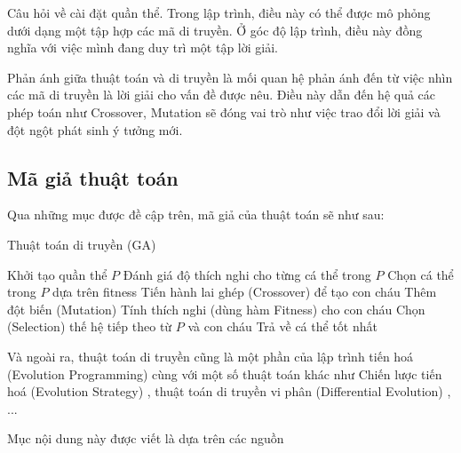 Câu hỏi về cài đặt quần thể. Trong lập trình, điều này có thể được mô phỏng dưới dạng một tập hợp các mã di truyền. Ở góc độ lập trình, điều này đồng nghĩa với việc mình đang duy trì một tập lời giải.

Phản ánh giữa thuật toán và di truyền là mối quan hệ phản ánh đến từ việc nhìn các mã di truyền là lời giải cho vấn đề được nêu. Điều này dẫn đến hệ quả các phép toán như Crossover, Mutation sẽ đóng vai trò như việc trao đổi lời giải và đột ngột phát sinh ý tưởng mới.

\subsection{Mã giả thuật toán}
Qua những mục được đề cập trên, mã giả của thuật toán sẽ như sau:
\begin{algorithm}
	\caption{Thuật toán di truyền (GA)}
	\begin{algorithmic}[1]
		\State Khởi tạo quần thể $P$
		\State Đánh giá độ thích nghi cho từng cá thể trong $P$
		\State Chọn cá thể trong $P$ dựa trên fitness
		\State Tiến hành lai ghép (Crossover) để tạo con cháu
		\State Thêm đột biến (Mutation)
		\State Tính thích nghi (dùng hàm Fitness) cho con cháu
		\State Chọn (Selection) thế hệ tiếp theo từ $P$ và con cháu
		\EndWhile
		\State Trả về cá thể tốt nhất
	\end{algorithmic}
\end{algorithm}

\noindent
Và ngoài ra, thuật toán di truyền cũng là một phần của lập trình tiến hoá (Evolution Programming) \cite{evolutionProgramming} cùng với một số thuật toán khác như Chiến lược tiến hoá (Evolution Strategy) \cite{EvolutionStrategy}, thuật toán di truyền vi phân (Differential Evolution) \cite{DifferientalEvolution1} \cite{DifferientalEvolution2}, ...

\par
Mục nội dung này được viết là dựa trên các nguồn \cite{GA1} \cite{GA2} \cite{GA3} \cite{GA4} \cite{GA5_Overview}

